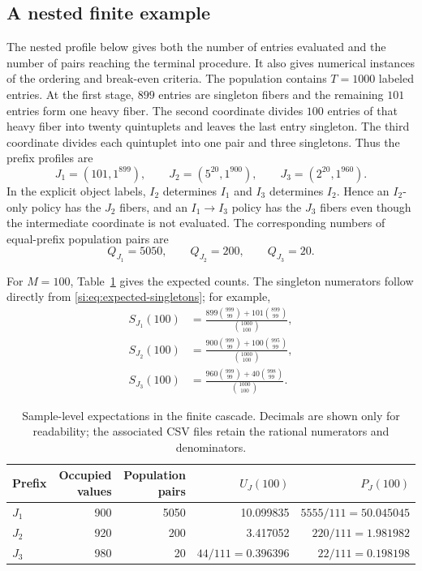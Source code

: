 \documentclass[9pt,twoside]{pnas-new}
\theoremstyle{definition}
\theoremstyle{remark}
\begin{document}
\subsection{A nested finite example}
The nested profile below gives both the number of entries evaluated and the number of pairs reaching the terminal procedure. It also gives numerical instances of the ordering and break-even criteria.
The population contains $T=1000$ labeled entries.  At the first stage, $899$ entries are singleton fibers and the remaining $101$ entries form one heavy fiber.  The second coordinate divides $100$ entries of that heavy fiber into twenty quintuplets and leaves the last entry singleton.  The third coordinate divides each quintuplet into one pair and three singletons.  Thus the prefix profiles are
\begin{equation}
 J_1=(101,1^{899}),\qquad
 J_2=(5^{20},1^{900}),\qquad
 J_3=(2^{20},1^{960}).
 \label{si:eq:benchmark-profiles}
\end{equation}
In the explicit object labels, $I_2$ determines $I_1$ and $I_3$ determines $I_2$.  Hence an $I_2$-only policy has the $J_2$ fibers, and an $I_1\to I_3$ policy has the $J_3$ fibers even though the intermediate coordinate is not evaluated.
The corresponding numbers of equal-prefix population pairs are
\begin{equation}
 Q_{J_1}=5050,
 \qquad
 Q_{J_2}=200,
 \qquad
 Q_{J_3}=20.
 \label{si:eq:benchmark-pop-pairs}
\end{equation}

For $M=100$, Table~\ref{si:tab:cascade-summary} gives the expected counts.  The singleton numerators follow directly from \eqref{si:eq:expected-singletons}; for example,
\begin{align*}
 S_{J_1}(100)
 &=\frac{899\binom{999}{99}+101\binom{899}{99}}{\binom{1000}{100}},\\
 S_{J_2}(100)
 &=\frac{900\binom{999}{99}+100\binom{995}{99}}{\binom{1000}{100}},\\
 S_{J_3}(100)
 &=\frac{960\binom{999}{99}+40\binom{998}{99}}{\binom{1000}{100}}.
\end{align*}

\begin{table}[ht]
\centering
\caption{Sample-level expectations in the finite cascade.  Decimals are shown only for readability; the associated CSV files retain the rational numerators and denominators.}
\label{si:tab:cascade-summary}
\begin{tabular}{lrrrr}
\toprule
Prefix & Occupied values & Population pairs & $U_J(100)$ & $P_J(100)$\\
\midrule
$J_1$ & 900 & 5050 & 10.099835 & $5555/111=50.045045$\\
$J_2$ & 920 & 200 & 3.417052 & $220/111=1.981982$\\
$J_3$ & 980 & 20 & $44/111=0.396396$ & $22/111=0.198198$\\
\bottomrule
\end{tabular}
\end{table}
\end{document}
